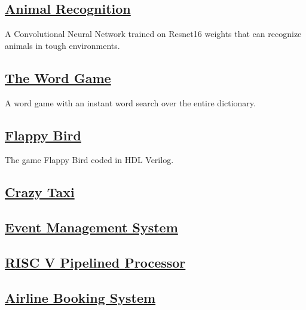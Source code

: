 \documentclass[]{resume}
\begin{document}
\begin{minipage}[t]{0.39\textwidth}
    \subsection{\href{https://github.com/aliasgharchakera/AI-Fall22-Project}{\textbf{Animal Recognition}}}%
    A Convolutional Neural Network trained on Resnet16 weights that can recognize animals in tough environments.

    \subsection{\href{https://github.com/aliasgharchakera/DS2-Spring22-Project}{\textbf{The Word Game}}}%
    A word game with an instant word search over the entire dictionary.

    \subsection{\href{https://github.com/aliasgharchakera/DLD-Fall21-Project}{\textbf{Flappy Bird}}}%
    The game Flappy Bird coded in HDL Verilog.

    \subsection{\href{https://github.com/aliasgharchakera/OOP-Fall21-Project}{\textbf{Crazy Taxi}}}%

    \subsection{\href{https://github.com/ZainAU/DBMS-Project}{\textbf{Event Management System}}}%

    \subsection{\href{https://github.com/aliasgharchakera/CA-Spring22-Project}{\textbf{RISC V Pipelined Processor}}}%

    \subsection{\href{https://github.com/aliasgharchakera/DSA-Spring21-Project}{\textbf{Airline Booking System}}}%
    

\end{minipage}
\end{document}
